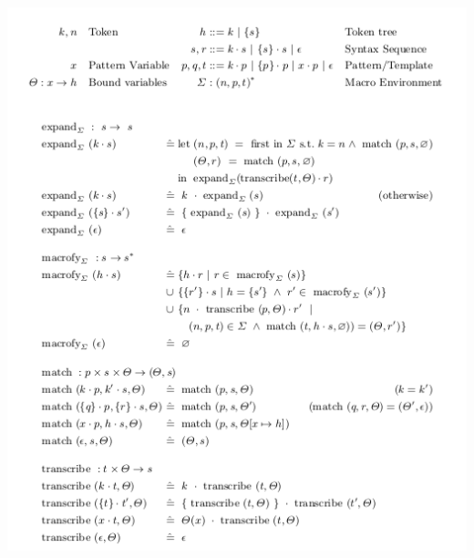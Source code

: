 \documentclass{article}
\begin{document}
\includegraphics[scale = 0.9]{algorithm.png}
\end{document}
